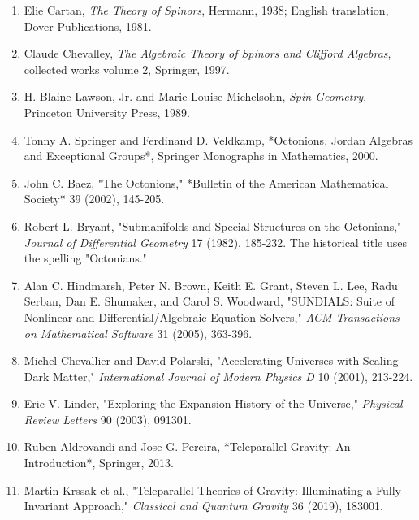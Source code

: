 \documentclass[11pt]{article}
\begin{document}
\begin{enumerate}
\item Elie Cartan, \emph{The Theory of Spinors}, Hermann, 1938; English translation,
Dover Publications, 1981.

\item Claude Chevalley, \emph{The Algebraic Theory of Spinors and Clifford Algebras},
collected works volume 2, Springer, 1997.

\item H. Blaine Lawson, Jr. and Marie-Louise Michelsohn, \emph{Spin Geometry},
Princeton University Press, 1989.

\item Tonny A. Springer and Ferdinand D. Veldkamp, *Octonions, Jordan Algebras
and Exceptional Groups*, Springer Monographs in Mathematics, 2000.

\item John C. Baez, "The Octonions," *Bulletin of the American Mathematical
Society* 39 (2002), 145-205.

\item Robert L. Bryant, "Submanifolds and Special Structures on the Octonians,"
\emph{Journal of Differential Geometry} 17 (1982), 185-232. The historical title uses the spelling "Octonians."

\item Alan C. Hindmarsh, Peter N. Brown, Keith E. Grant, Steven L. Lee, Radu
Serban, Dan E. Shumaker, and Carol S. Woodward, "SUNDIALS: Suite of Nonlinear and Differential/Algebraic Equation Solvers," \emph{ACM Transactions on Mathematical Software} 31 (2005), 363-396.

\item Michel Chevallier and David Polarski, "Accelerating Universes with Scaling
Dark Matter," \emph{International Journal of Modern Physics D} 10 (2001), 213-224.

\item Eric V. Linder, "Exploring the Expansion History of the Universe,"
\emph{Physical Review Letters} 90 (2003), 091301.

\item Ruben Aldrovandi and Jose G. Pereira, *Teleparallel Gravity: An
Introduction*, Springer, 2013.

\item Martin Krssak et al., "Teleparallel Theories of Gravity: Illuminating a
Fully Invariant Approach," \emph{Classical and Quantum Gravity} 36 (2019), 183001.

\end{enumerate}
\end{document}
